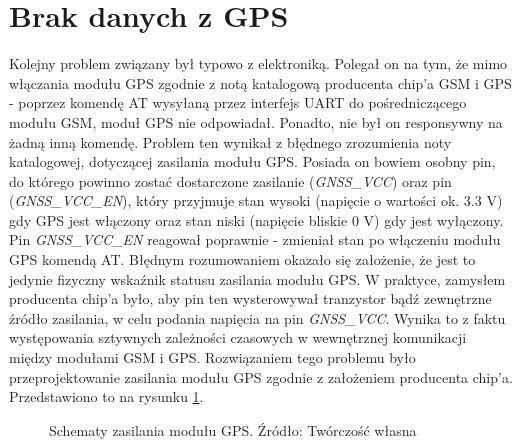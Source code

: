 \section{Brak danych z GPS}

Kolejny problem związany był typowo z elektroniką. Polegał on na tym, że mimo włączania modułu GPS zgodnie z notą katalogową producenta chip'a GSM i GPS - poprzez komendę AT wysyłaną przez interfejs UART do pośredniczącego modułu GSM, moduł GPS nie odpowiadał. Ponadto, nie był on responsywny na żadną inną komendę. Problem ten wynikał z błędnego zrozumienia noty katalogowej, dotyczącej zasilania modułu GPS. Posiada on bowiem osobny pin, do którego powinno zostać dostarczone zasilanie (\textit{GNSS\_VCC}) oraz pin (\textit{GNSS\_VCC\_EN}), który przyjmuje stan wysoki (napięcie o wartości ok. 3.3 V) gdy GPS jest włączony oraz stan niski (napięcie bliskie 0 V) gdy jest wyłączony. Pin \textit{GNSS\_VCC\_EN} reagował poprawnie - zmieniał stan po włączeniu modułu GPS komendą AT. Błędnym rozumowaniem okazało się założenie, że jest to jedynie fizyczny wskaźnik statusu zasilania modułu GPS. W praktyce, zamysłem producenta chip'a było, aby pin ten wysterowywał tranzystor bądź zewnętrzne źródło zasilania, w celu podania napięcia na pin \textit{GNSS\_VCC}. Wynika to z faktu występowania sztywnych zależności czasowych w wewnętrznej komunikacji między modułami GSM i GPS. Rozwiązaniem tego problemu było przeprojektowanie zasilania modułu GPS zgodnie z założeniem producenta chip'a. Przedstawiono to na rysunku \ref{fig:image_mistake_gps_power}.

\begin{figure}[H]
\centering
	\qquad
	
	\caption{Schematy zasilania modułu GPS. Źródło: Twórczość własna}
	\label{fig:image_mistake_gps_power}
\end{figure}


